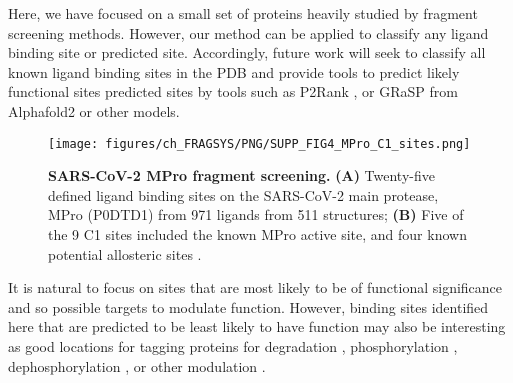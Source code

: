 Here, we have focused on a small set of proteins heavily studied by fragment screening methods. However, our method can be applied to classify any ligand binding site or predicted site. Accordingly, future work will seek to classify all known ligand binding sites in the PDB and provide tools to predict likely functional sites predicted sites by tools such as P2Rank \cite{KRIVAK_2018_P2RANK}, or GRaSP \cite{SANTANA_2020_GRaSP, SANTANA_2022_GRaSP} from Alphafold2 \cite{JUMPER_2021_ALPHAFOLD, VARADI_2022_ALPHAFOLDDB} or other models.

\begin{figure}[ht!]
    \centering
    \texttt{[image: figures/ch\_FRAGSYS/PNG/SUPP\_FIG4\_MPro\_C1\_sites.png]}
    \caption[SARS-CoV-2 MPro fragment screening]{\textbf{SARS-CoV-2 MPro fragment screening.} \textbf{(A)} Twenty-five defined ligand binding sites on the SARS-CoV-2 main protease, MPro (P0DTD1) from 971 ligands from 511 structures; \textbf{(B)} Five of the 9 C1 sites included the known MPro active site, and four known potential allosteric sites \cite{DOUANGAMATH_2020_SARSCOV2, DASGUPTA_2022_ALLOSTERIC}.}
    \label{fig:MPro_showcase}
\end{figure}

It is natural to focus on sites that are most likely to be of functional significance and so possible targets to modulate function. However, binding sites identified here that are predicted to be least likely to have function may also be interesting as good locations for tagging proteins for degradation \cite{BEKES_2022_PROTACS}, phosphorylation \cite{SIRIWARDENA_2020_PHOSPHO}, dephosphorylation \cite{SIMPSON_2023_ADPROM}, or other modulation \cite{HEITEL_2023_PTMS, PENG_2023_PTMS}.